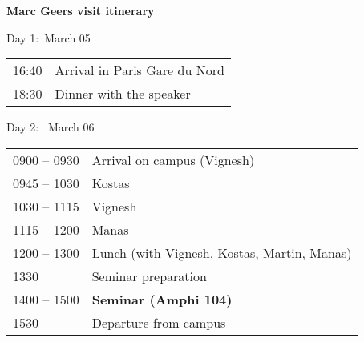 \documentclass[a4paper,11pt,fleqn]{article}
\begin{document}
	\sffamily
	\thispagestyle{titlepage}
	\vspace*{-2em}
	\begin{center}
		\huge \textbf{Marc Geers visit itinerary}
	\end{center}
	\begin{center}
		\Large 
		Day 1:~March 05 \\
		\vspace*{0.5em}
		\begin{tabular}{| p{4cm} p{13cm} |}
			\hline
			16:40 & Arrival in Paris Gare du Nord \\
			18:30 & Dinner with the speaker \\
			\hline
		\end{tabular}
		
		Day 2:~ March 06 \\
		\vspace*{0.5em}
		\begin{tabular}{| p{4cm} p{13cm} |}
			\hline
			0900 -- 0930 & Arrival on campus (Vignesh) \\
			0945 -- 1030 &  Kostas \\
			1030 -- 1115 &  Vignesh \\
			1115 -- 1200 &   Manas \\
			1200 -- 1300 & Lunch (with Vignesh, Kostas, Martin, Manas) \\
			1330 & Seminar preparation \\
			1400 -- 1500 & \textbf{Seminar (Amphi 104)} \\ 
			1530 &  Departure from campus \\
			\hline
		\end{tabular}
	\end{center}
		
\end{document}
